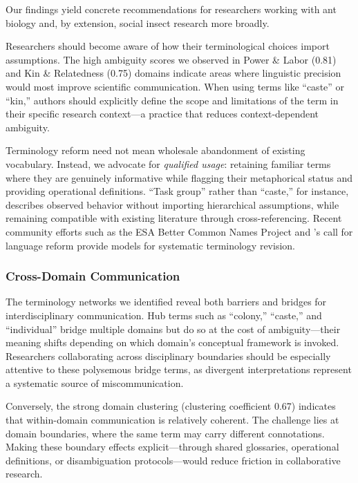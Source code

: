 \documentclass[
]{article}
\numberwithin{equation}{section}
\begin{document}
Our findings yield concrete recommendations for researchers working with
ant biology and, by extension, social insect research more broadly.

Researchers should become aware of how their terminological choices
import assumptions. The high ambiguity scores we observed in Power \&
Labor (0.81) and Kin \& Relatedness (0.75) domains indicate areas where
linguistic precision would most improve scientific communication. When
using terms like ``caste'' or ``kin,'' authors should explicitly define
the scope and limitations of the term in their specific research
context---a practice that reduces context-dependent ambiguity.

Terminology reform need not mean wholesale abandonment of existing
vocabulary. Instead, we advocate for \emph{qualified usage}: retaining
familiar terms where they are genuinely informative while flagging their
metaphorical status and providing operational definitions. ``Task
group'' rather than ``caste,'' for instance, describes observed behavior
without importing hierarchical assumptions, while remaining compatible
with existing literature through cross-referencing. Recent community
efforts such as the ESA Better Common Names Project
\cite{betternamesproject2024} and \citeauthor{herbers2007}'s
\citeyearpar{herbers2007} call for language reform provide models for
systematic terminology revision.

\subsubsection{Cross-Domain
Communication}\label{cross-domain-communication}

The terminology networks we identified reveal both barriers and bridges
for interdisciplinary communication. Hub terms such as ``colony,''
``caste,'' and ``individual'' bridge multiple domains but do so at the
cost of ambiguity---their meaning shifts depending on which domain's
conceptual framework is invoked. Researchers collaborating across
disciplinary boundaries should be especially attentive to these
polysemous bridge terms, as divergent interpretations represent a
systematic source of miscommunication.

Conversely, the strong domain clustering (clustering coefficient 0.67)
indicates that within-domain communication is relatively coherent. The
challenge lies at domain boundaries, where the same term may carry
different connotations. Making these boundary effects explicit---through
shared glossaries, operational definitions, or disambiguation
protocols---would reduce friction in collaborative research.
\end{document}
